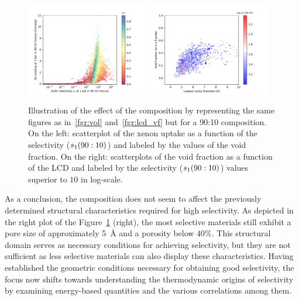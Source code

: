 \documentclass[main.tex]{subfiles}
\begin{document}
\begin{figure}[ht!]
  \centering
  \includegraphics[width=0.48\textwidth]{figures/2-thermo/Scatterplot_uptake_selectivity_vol_9010.pdf}  
  \includegraphics[width=0.48\textwidth]{figures/2-thermo/Scatterplot_vf_lcd_selectivity9010.pdf}
  \caption{Illustration of the effect of the composition by representing the same figures as in~\ref{fgr:vol} and~\ref{fgr:lcd_vf} but for a 90:10 composition. On the left: scatterplot of the xenon uptake as a function of the selectivity ($s_{\text{1}}(90:10)$) and labeled by the values of the void fraction. On the right: scatterplots of the void fraction as a function of the LCD and labeled by the selectivity ($s_{\text{1}}(90:10)$) values superior to $10$ in log-scale.}\label{fgr:compo}
\end{figure}

As a conclusion, the composition does not seem to affect the previously determined structural characteristics required for high selectivity. As depicted in the right plot of the Figure~\ref{fgr:compo} (right), the most selective materials still exhibit a pore size of approximately \SI{5}{\angstrom} and a porosity below {$40$\%}. This structural domain serves as necessary conditions for achieving selectivity, but they are not sufficient as less selective materials can also display these characteristics. Having established the geometric conditions necessary for obtaining good selectivity, the focus now shifts towards understanding the thermodynamic origins of selectivity by examining energy-based quantities and the various correlations among them.
\end{document}
